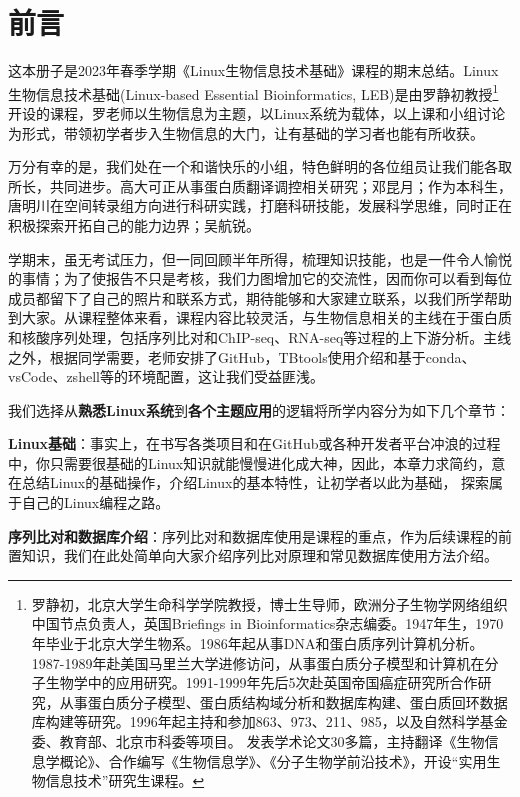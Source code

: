 \chapter*{前言}

这本册子是2023年春季学期《Linux生物信息技术基础》课程的期末总结。Linux生物信息技术基础(Linux-based Essential Bioinformatics, LEB)是由罗静初教授\footnote{罗静初，北京大学生命科学学院教授，博士生导师，欧洲分子生物学网络组织中国节点负责人，英国Briefings in Bioinformatics杂志编委。1947年生，1970年毕业于北京大学生物系。1986年起从事DNA和蛋白质序列计算机分析。1987-1989年赴美国马里兰大学进修访问，从事蛋白质分子模型和计算机在分子生物学中的应用研究。1991-1999年先后5次赴英国帝国癌症研究所合作研究，从事蛋白质分子模型、蛋白质结构域分析和数据库构建、蛋白质回环数据库构建等研究。1996年起主持和参加863、973、211、985，以及自然科学基金委、教育部、北京市科委等项目。 发表学术论文30多篇，主持翻译《生物信息学概论》、合作编写《生物信息学》、《分子生物学前沿技术》，开设“实用生物信息技术”研究生课程。}开设的课程，罗老师以生物信息为主题，以Linux系统为载体，以上课和小组讨论为形式，带领初学者步入生物信息的大门，让有基础的学习者也能有所收获。

万分有幸的是，我们处在一个和谐快乐的小组，特色鲜明的各位组员让我们能各取所长，共同进步。高大可正从事蛋白质翻译调控相关研究；邓昆月；作为本科生，唐明川在空间转录组方向进行科研实践，打磨科研技能，发展科学思维，同时正在积极探索开拓自己的能力边界；吴航锐。

学期末，虽无考试压力，但一同回顾半年所得，梳理知识技能，也是一件令人愉悦的事情；为了使报告不只是考核，我们力图增加它的交流性，因而你可以看到每位成员都留下了自己的照片和联系方式，期待能够和大家建立联系，以我们所学帮助到大家。从课程整体来看，课程内容比较灵活，与生物信息相关的主线在于蛋白质和核酸序列处理，包括序列比对和ChIP-seq、RNA-seq等过程的上下游分析。主线之外，根据同学需要，老师安排了GitHub，TBtools使用介绍和基于conda、vsCode、zshell等的环境配置，这让我们受益匪浅。

我们选择从\textbf{熟悉Linux系统}到\textbf{各个主题应用}的逻辑将所学内容分为如下几个章节：

\textbf{Linux基础}：事实上，在书写各类项目和在GitHub或各种开发者平台冲浪的过程中，你只需要很基础的Linux知识就能慢慢进化成大神，因此，本章力求简约，意在总结Linux的基础操作，介绍Linux的基本特性，让初学者以此为基础， 探索属于自己的Linux编程之路。

\textbf{序列比对和数据库介绍}：序列比对和数据库使用是课程的重点，作为后续课程的前置知识，我们在此处简单向大家介绍序列比对原理和常见数据库使用方法介绍。

